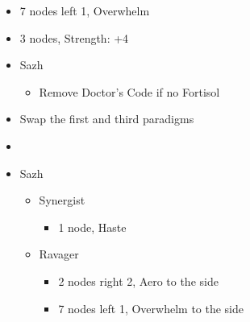 \begin{paracol}{2}
\begin{menu}
\begin{itemize}
\begin{itemize}
\begin{itemize}
\begin{itemize}
						            \item 7 nodes left 1, Overwhelm
						            \item 3 nodes, Strength: +4
					            \end{itemize}
				      \end{itemize}
			\end{itemize}
			\equip
			\begin{itemize}
				\item Sazh
				      \begin{itemize}
					      \item Remove Doctor's Code if no Fortisol
				      \end{itemize}
			\end{itemize}
		\end{itemize}
	\end{menu}
	\switchcolumn
	\begin{menu}
		\begin{itemize}
			\paradigm
			\begin{itemize}
				\item Swap the first and third paradigms
				\item {}%
				      {\paradigmline[1]{\textit{\syn}}{\textit{\sab}}{}}%
				      {\paradigmline{\com}{\med}{}}%
				      {\paradigmline{\com}{\rav}{}}%
				      {\paradigmline{\rav}{\rav}{}}%
				      {\paradigmline{[\rav]}{(\sab)}{}}%
				      {\paradigmline{[\com]}{(\sab)}{}}
			\end{itemize}
			\crystarium
			\begin{itemize}
				\item Sazh
				      \begin{itemize}
					      \item Synergist
					            \begin{itemize}
						            \item 1 node, Haste
					            \end{itemize}
					      \item Ravager
					            \begin{itemize}
						            \item 2 nodes right 2, Aero to the side
						            \item 7 nodes left 1, Overwhelm to the side
					            \end{itemize}
				      \end{itemize}
			\end{itemize}

\end{itemize}
\end{menu}
\end{paracol}
